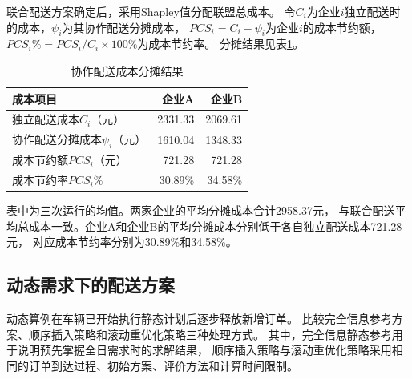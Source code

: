 \documentclass{setp-new}
\begin{document}
联合配送方案确定后，采用Shapley值分配联盟总成本。
令$C_i$为企业$i$独立配送时的成本，$\psi_i$为其协作配送分摊成本，
$PCS_i=C_i-\psi_i$为企业$i$的成本节约额，$PCS_i\%=PCS_i/C_i\times100\%$为成本节约率。
分摊结果见表\ref{tab:allocation}。

\begin{table}[H]
  \centering
  \caption{协作配送成本分摊结果}
  \label{tab:allocation}
  \small
  \begin{tabular*}{\textwidth}{@{\extracolsep{\fill}}lrr}
    \toprule
    成本项目 & 企业A & 企业B\\
    \midrule
    独立配送成本$C_i$（元） & 2331.33 & 2069.61\\
    协作配送分摊成本$\psi_i$（元） & 1610.04 & 1348.33\\
    成本节约额$PCS_i$（元） & 721.28 & 721.28\\
    成本节约率$PCS_i\%$ & 30.89\% & 34.58\%\\
    \bottomrule
  \end{tabular*}
\end{table}

表中为三次运行的均值。两家企业的平均分摊成本合计2958.37元，
与联合配送平均总成本一致。企业A和企业B的平均分摊成本分别低于各自独立配送成本721.28元，
对应成本节约率分别为30.89\%和34.58\%。

\subsection{动态需求下的配送方案}

动态算例在车辆已开始执行静态计划后逐步释放新增订单。
比较完全信息参考方案、顺序插入策略和滚动重优化策略三种处理方式。
其中，完全信息静态参考用于说明预先掌握全日需求时的求解结果，
顺序插入策略与滚动重优化策略采用相同的订单到达过程、初始方案、评价方法和计算时间限制。
\end{document}
